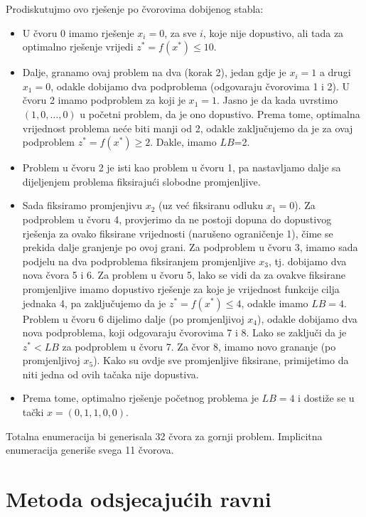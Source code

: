 \documentclass[a4paper, utf8, 11pt, colorlinks]{book}
\theoremstyle{definition}
\begin{document}
Prodiskutujmo ovo rješenje po čvorovima dobijenog stabla:
  \begin{itemize}
      \item U čvoru 0 imamo  rješenje $x_i = 0$, za sve $i$, koje  nije dopustivo, ali  tada za optimalno rješenje vrijedi $z^*=f(x^*) \leq 10$.
      \item  Dalje, granamo ovaj problem na dva (korak 2), jedan gdje je $x_i=1$ a drugi $x_1=0$, odakle dobijamo dva podproblema (odgovaraju čvorovima 1 i 2). U čvoru 2 imamo podproblem za koji je $x_1=1$. Jasno je da kada uvrstimo $(1,0, \ldots, 0)$ u početni problem, da je ono dopustivo. Prema tome, optimalna vrijednost problema neće biti manji od 2, odakle zaključujemo da je za ovaj podproblem $z^*=f(x^*) \geq 2$. Dakle, imamo $LB$=2. 
      \item Problem u čvoru 2 je isti kao problem u čvoru 1, pa nastavljamo dalje sa dijeljenjem problema fiksirajući slobodne promjenljive. 
      \item Sada fiksiramo promjenjivu $x_2$ (uz već fiksiranu odluku $x_1=0$). 
            Za podproblem u čvoru 4, provjerimo da ne postoji dopuna do dopustivog rješenja za ovako fiksirane vrijednosti (narušeno ograničenje 1), čime se prekida dalje granjenje po ovoj grani. Za podproblem u čvoru 3, imamo sada podjelu na dva podproblema fiksiranjem promjenljive $x_3$, tj. dobijamo dva   nova čvora 5 i 6. Za problem u čvoru 5, lako se vidi da za ovakve fiksirane promjenljive imamo dopustivo rješenje za koje je vrijednost funkcije cilja jednaka 4, pa zaključujemo da je $z^*=f(x^*) \leq 4$, odakle imamo $LB=4$. Problem u čvoru 6 dijelimo dalje (po promjenljivoj $x_4$), odakle dobijamo dva nova podproblema, koji odgovaraju čvorovima 7 i 8. Lako se zaključi da je $z^*<LB$ za   podproblem u čvoru 7.  Za čvor 8, imamo novo grananje (po promjenljivoj $x_5$). Kako su ovdje sve promjenljive fiksirane, primijetimo da niti jedna od ovih tačaka  nije dopustiva.
            \item Prema tome, optimalno rješenje početnog problema je $LB=4$ i dostiže se u tački $x=(0, 1, 1, 0, 0)$. 
  \end{itemize}
  Totalna enumeracija bi generisala 32 čvora za gornji problem. Implicitna enumeracija generiše svega 11 čvorova. 
 
\section{Metoda odsjecajućih ravni}
  
\end{document}
